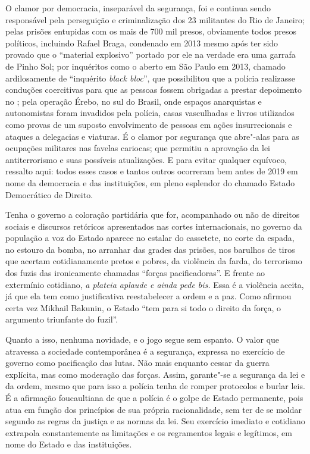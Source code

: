 O clamor por democracia, inseparável da segurança, foi e continua sendo
responsável pela perseguição e criminalização dos 23 militantes do Rio
de Janeiro; pelas prisões entupidas com os mais de 700 mil presos,
obviamente todos presos políticos, incluindo Rafael Braga, condenado em
2013 mesmo após ter sido provado que o ``material explosivo'' portado
por ele na verdade era uma garrafa de Pinho Sol; por inquéritos como o
aberto em São Paulo em 2013, chamado ardilosamente de ``inquérito \emph{black
bloc}'', que possibilitou que a polícia realizasse conduções coercitivas
para que as pessoas fossem obrigadas a prestar depoimento no ; pela
operação Érebo, no sul do Brasil, onde espaços anarquistas e
autonomistas foram invadidos pela polícia, casas vasculhadas e livros
utilizados como provas de um suposto envolvimento de pessoas em ações
insurrecionais e ataques a delegacias e viaturas. É o clamor por
segurança que abre"-alas para as ocupações militares nas favelas
cariocas; que permitiu a aprovação da lei antiterrorismo e suas
possíveis atualizações. E para evitar qualquer equívoco, ressalto aqui:
todos esses casos e tantos outros ocorreram bem antes de 2019 em nome da
democracia e das instituições, em pleno esplendor do chamado Estado
Democrático de Direito.

Tenha o governo a coloração partidária que for, acompanhado ou não de
direitos sociais e discursos retóricos apresentados nas cortes
internacionais, no governo da população a voz do Estado aparece no
estalar do cassetete, no corte da espada, no estouro da bomba, no
arranhar das grades das prisões, nos barulhos de tiros que acertam
cotidianamente pretos e pobres, da violência da farda, do terrorismo dos
fuzis das ironicamente chamadas ``forças pacificadoras''. E frente ao
extermínio cotidiano, \emph{a plateia aplaude e ainda pede bis.} Essa é
a violência aceita, já que ela tem como justificativa reestabelecer a
ordem e a paz. Como afirmou certa vez Mikhail Bakunin, o Estado ``tem
para si todo o direito da força, o argumento triunfante do fuzil''.

Quanto a isso, nenhuma novidade, e o jogo segue sem espanto. O valor que
atravessa a sociedade contemporânea é a segurança, expressa no exercício
de governo como pacificação das lutas. Não mais enquanto cessar da
guerra explícita, mas como moderação das forças. Assim, garante"-se a
segurança da lei e da ordem, mesmo que para isso a polícia tenha de
romper protocolos e burlar leis. É a afirmação foucaultiana de
que a polícia é o golpe de Estado permanente, pois atua em função dos
princípios de sua própria racionalidade, sem ter de se moldar segundo as
regras da justiça e as normas da lei. Seu exercício imediato e cotidiano
extrapola constantemente as limitações e os regramentos legais e
legítimos, em nome do Estado e das instituições.

